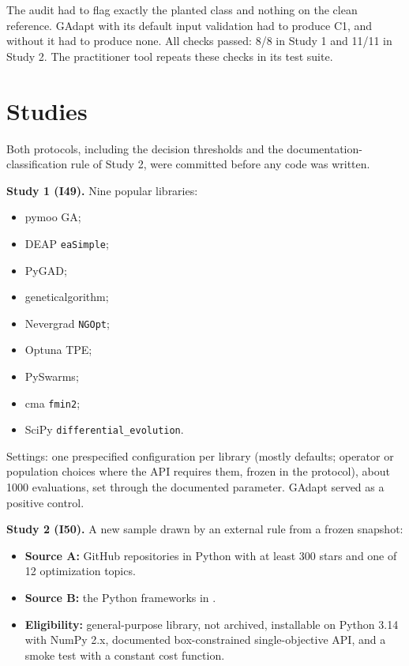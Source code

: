 \documentclass[acmsmall,screen,review,anonymous=false]{acmart}
\providecommand{\tightlist}{\setlength{\itemsep}{0pt}\setlength{\parskip}{0pt}}
\newcounter{none}
\begin{document}
The audit had to flag exactly the planted class and nothing on the clean reference. GAdapt with its default input
validation had to produce C1, and without it had to produce none. All checks passed: 8/8 in Study 1 and 11/11 in
Study 2. The practitioner tool repeats these checks in its test suite.

\section{Studies}\label{studies}

Both protocols, including the decision thresholds and the documentation-classification rule of Study 2, were
committed before any code was written.

\textbf{Study 1 (I49).} Nine popular libraries:

\begin{itemize}
\tightlist
\item
  pymoo GA;
\item
  DEAP \texttt{eaSimple};
\item
  PyGAD;
\item
  geneticalgorithm;
\item
  Nevergrad \texttt{NGOpt};
\item
  Optuna TPE;
\item
  PySwarms;
\item
  cma \texttt{fmin2};
\item
  SciPy \texttt{differential\_\allowbreak{}evolution}.
\end{itemize}

Settings: one prespecified configuration per library (mostly defaults; operator or population choices where the
API requires them, frozen in the protocol), about 1000 evaluations, set through the documented parameter. GAdapt served as a
positive control.

\textbf{Study 2 (I50).} A new sample drawn by an external rule from a frozen snapshot:

\begin{itemize}
\tightlist
\item
  \textbf{Source A:} GitHub repositories in Python with at least 300 stars and one of 12 optimization topics.
\item
  \textbf{Source B:} the Python frameworks in \citet{Ravber_2025}.
\item
  \textbf{Eligibility:} general-purpose library, not archived, installable on Python 3.14 with NumPy 2.x, documented
  box-constrained single-objective API, and a smoke test with a constant cost function.
\end{itemize}
\end{document}
